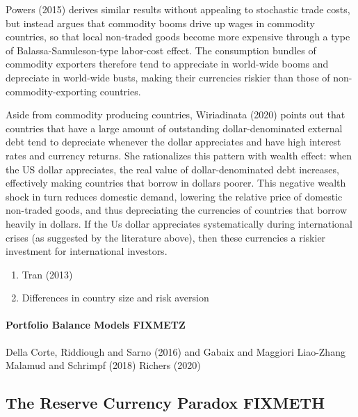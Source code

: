 \documentclass{ar-1col}
\begin{document}
Powers (2015) derives similar results without appealing to stochastic trade costs, but instead argues that commodity booms drive up wages in commodity countries, so that local non-traded goods become more expensive through a type of Balassa-Samuleson-type labor-cost effect. The consumption bundles of commodity exporters therefore tend to appreciate in world-wide booms and depreciate in world-wide busts, making their currencies riskier than those of non-commodity-exporting countries.

Aside from commodity producing countries, Wiriadinata (2020) points out that countries that have a large amount of outstanding dollar-denominated external debt tend to depreciate whenever the dollar appreciates and have high interest rates and currency returns. She rationalizes this pattern with wealth effect: when the US dollar appreciates, the real value of dollar-denominated debt increases, effectively making countries that borrow in dollars poorer. This negative wealth shock in turn reduces domestic demand, lowering the relative price of domestic non-traded goods, and thus depreciating the currencies of countries that borrow heavily in dollars. If the Us dollar appreciates systematically during international crises (as suggested by the literature above), then these currencies a riskier investment for international investors.



  
\begin{enumerate}
\item Tran (2013)   
\item \citet{GourinchasGovillotRey2017} Differences in country size and
  risk aversion
\end{enumerate} 


\paragraph*{Portfolio Balance Models FIXMETZ}

Della Corte, Riddiough and Sarno (2016) and Gabaix and Maggiori Liao-Zhang
Malamud and Schrimpf (2018) Richers (2020)



 
\begin{textbox}[h]
\section{The Reserve Currency Paradox FIXMETH}
\end{textbox}
\end{document}
